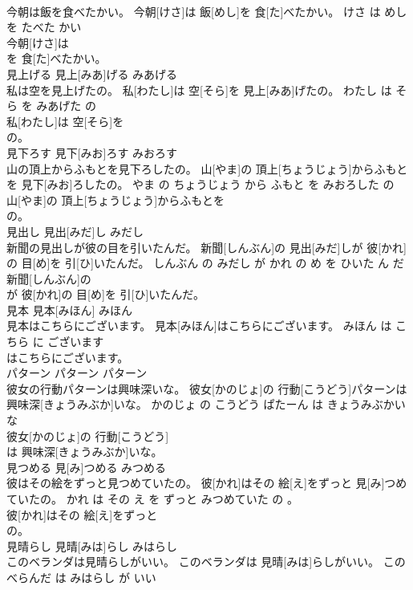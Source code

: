 \documentclass[8pt]{extreport}
\begin{document}
\begin{CJK}{UTF8}{min}
\\	今朝は飯を食べたかい。	今朝[けさ]は 飯[めし]を 食[た]べたかい。	けさ は めし を たべた かい	
\\	今朝[けさ]は
\\	を 食[た]べたかい。			
\\	見上げる	見上[みあ]げる	みあげる	
\\	私は空を見上げたの。	私[わたし]は 空[そら]を 見上[みあ]げたの。	わたし は そら を みあげた の	
\\	私[わたし]は 空[そら]を
\\	の。			
\\	見下ろす	見下[みお]ろす	みおろす	
\\	山の頂上からふもとを見下ろしたの。	山[やま]の 頂上[ちょうじょう]からふもとを 見下[みお]ろしたの。	やま の ちょうじょう から ふもと を みおろした の	
\\	山[やま]の 頂上[ちょうじょう]からふもとを
\\	の。			
\\	見出し	見出[みだ]し	みだし	
\\	新聞の見出しが彼の目を引いたんだ。	新聞[しんぶん]の 見出[みだ]しが 彼[かれ]の 目[め]を 引[ひ]いたんだ。	しんぶん の みだし が かれ の め を ひいた ん だ	
\\	新聞[しんぶん]の
\\	が 彼[かれ]の 目[め]を 引[ひ]いたんだ。			
\\	見本	見本[みほん]	みほん	
\\	見本はこちらにございます。	見本[みほん]はこちらにございます。	みほん は こちら に ございます	
\\	はこちらにございます。			
\\	パターン	パターン	パターン	
\\	彼女の行動パターンは興味深いな。	彼女[かのじょ]の 行動[こうどう]パターンは 興味深[きょうみぶか]いな。	かのじょ の こうどう ぱたーん は きょうみぶかい な	
\\	彼女[かのじょ]の 行動[こうどう]
\\	は 興味深[きょうみぶか]いな。			
\\	見つめる	見[み]つめる	みつめる	
\\	彼はその絵をずっと見つめていたの。	彼[かれ]はその 絵[え]をずっと 見[み]つめていたの。	かれ は その え を ずっと みつめていた の 。	
\\	彼[かれ]はその 絵[え]をずっと
\\	の。			
\\	見晴らし	見晴[みは]らし	みはらし	
\\	このベランダは見晴らしがいい。	このベランダは 見晴[みは]らしがいい。	この べらんだ は みはらし が いい	

\end{CJK}
\end{document}
